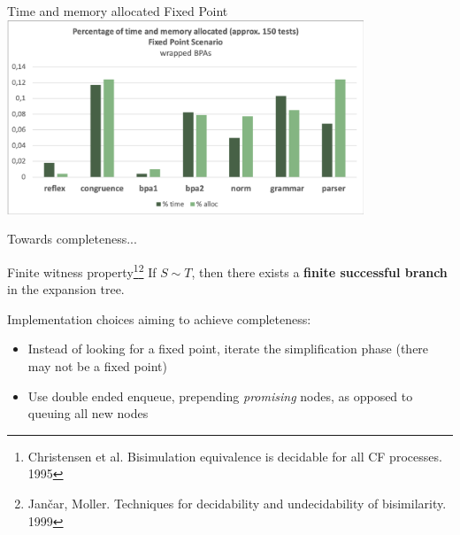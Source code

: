 \documentclass[10pt]{beamer}
\begin{document}
\begin{frame}{Time and memory allocated \hfill {\color{mLightBrown}Fixed Point}}
	\hspace*{-4mm}\includegraphics[height=5.8cm]{img/fixed_point2}
\end{frame}



\begin{frame}{Towards completeness...}

	\begin{block}{Finite witness property\footnote{ Christensen et al. Bisimulation equivalence is decidable for all CF processes. 1995}\footnote{Jan{\v{c}}ar, Moller. Techniques for decidability and undecidability of bisimilarity. 1999}}
		\smallskip
		If $S\sim T$, then there exists a {\bf finite successful branch} in the expansion tree.
	\end{block}

	\vspace*{5mm}
	
	Implementation choices aiming to achieve completeness:
	\begin{itemize}
		\item Instead of looking for a fixed point, iterate the simplification phase (there may not be a fixed point)
		\item Use double ended enqueue, prepending \emph{promising} nodes, as opposed to queuing all new nodes
	\end{itemize}
\end{frame}
\end{document}
